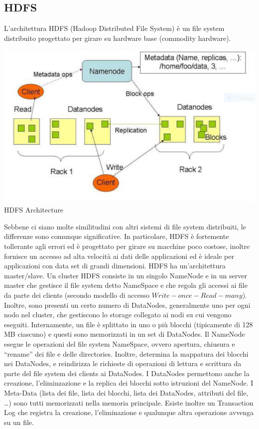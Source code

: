 \documentclass[a4page, 11pt]{article}
\begin{document}
\subsection{HDFS}
L’architettura HDFS (Hadoop Distributed File System) è un file system distribuito progettato per girare su hardware base (commodity hardware).
\begin{center}
	\includegraphics[scale=0.70]{IMAGE7.png}\\
	HDFS Architecture
\end{center}
Sebbene ci siano molte similitudini con altri sistemi di file system distribuiti, le differenze sono comunque significative. In particolare, HDFS è fortemente tollerante agli errori
ed è progettato per girare su macchine poco costose, inoltre fornisce un accesso ad alta velocità ai dati delle applicazioni ed è ideale per applicazioni con data set di grandi dimensioni. HDFS ha un’architettura master/slave. Un cluster HDFS consiste in un singolo NameNode e in un server master che gestisce il file system detto NameSpace e che regola gli accessi ai file da parte dei clients (secondo modello di accesso $Write-once-Read-many$). Inoltre, sono presenti un certo numero di DataNodes, generalmente uno per ogni nodo nel cluster, che gestiscono lo storage collegato ai nodi su cui vengono eseguiti. Internamente, un file è splittato in uno o più blocchi (tipicamente di 128 MB ciascuno) e questi sono memorizzati in un set di DataNodes. Il NameNode esegue le operazioni del file system NameSpace, ovvero apertura, chiusura e “rename” dei file e delle directories. Inoltre, determina la mappatura dei blocchi nei DataNodes, e reindirizza le richieste di operazioni di lettura e scrittura da parte del file system dei clients ai DataNodes. I DataNodes permettono anche la creazione, l’eliminzazione e la replica dei blocchi sotto istruzioni del NameNode. I Meta-Data (lista dei file, lista dei blocchi, lista dei DataNodes, attributi del file, …) sono tutti memorizzati nella memoria principale. Esiste inoltre un Transaction Log che registra la creazione, l’eliminazione e qualunque altra operazione avvenga su un file.
\end{document}
